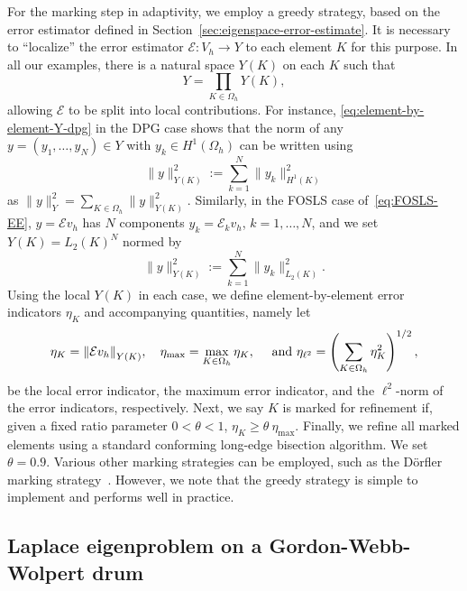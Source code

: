 \documentclass[12pt, oneside, reqno]{amsart}
\theoremstyle{remark}
\newcommand{\tAnd}{\text{ and }}
\DeclarePairedDelimiter{\norm}{\lVert}{\rVert}
\newcommand{\EE}{\mathcal{E}}
\newcommand{\oh}{\Omega_h}
\begin{document}
For the marking step in adaptivity,
we employ a greedy strategy, based on the error estimator
defined in Section~\ref{sec:eigenspace-error-estimate}.
It is necessary to  ``localize'' the error estimator \(\EE: V_h \to Y\) to each element \(K\) for this purpose. In all our examples, there is a natural
space $Y(K)$ on each $K$ such that 
\[
  Y = \prod_{K \in \oh} Y(K),
\]
allowing $\EE$ to be split into local contributions.  For instance,
\eqref{eq:element-by-element-Y-dpg} in the DPG case shows that the
norm of any $y = (y_1, \dots, y_N) \in Y$ with $y_k \in H^1(\oh)$ can
be written using
\[
  \| y \|_{Y(K)}^2 := \sum_{k=1}^N \| y_k \|_{H^1(K)}^2
\]
as $\| y\|_Y^2 = \sum_{K \in \oh} \| y\|_{Y(K)}^2$. Similarly, in the FOSLS 
case of~\eqref{eq:FOSLS-EE}, $y = \EE v_h$ has $N$ components $y_k = \EE_k v_h$, $k=1,\dots, N$, and we set $Y(K) = L_2(K)^N$ normed by 
\[
  \| y \|_{Y(K)}^2 := \sum_{k=1}^N \| y_k \|_{L_2(K)}^2.
\]
Using the local $Y(K)$ in each case, we define element-by-element
error indicators $\eta_K$ and accompanying quantities, namely let 
\begin{equation*}
  \eta_K = \norm*{\EE v_h}_{Y(K)}, \quad
  \eta_{\max} = \max_{K \in \Omega_h} \eta_K, \quad \tAnd
  \eta_{\ell^2} = \left( \sum_{K \in \Omega_h} \eta_K^2 \right)^{1/2},
\end{equation*}
be the local error indicator, the maximum error indicator, and the
\(\ell^2\)-norm of the error indicators, respectively.
Next, we say \(K\) is marked for refinement if, given a fixed ratio
parameter \(0 < \theta < 1\), \(\eta_K \geq \theta \ \eta_{\max}\).
Finally, we refine all marked elements using a standard conforming long-edge
bisection algorithm.
We set \(\theta = 0.9\).
Various other  marking strategies can be
employed, such as the Dörfler marking strategy~\cite{Dor1995-1}.
However, we note that the greedy strategy is simple to implement and
performs well in practice.


\subsection{Laplace eigenproblem on a Gordon-Webb-Wolpert drum}
\end{document}
